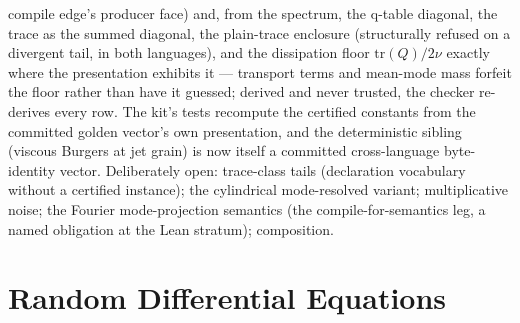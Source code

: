 compile edge's producer face) and, from the spectrum, the q-table
diagonal, the trace as the summed diagonal, the plain-trace
enclosure (structurally refused on a divergent tail, in both
languages), and the dissipation floor $\mathrm{tr}(Q)/2\nu$ exactly
where the presentation exhibits it --- transport terms and mean-mode
mass forfeit the floor rather than have it guessed; derived and
never trusted, the checker re-derives every row. The kit's tests
recompute the certified constants from the committed golden vector's
own presentation, and the deterministic sibling (viscous Burgers at
jet grain) is now itself a committed cross-language byte-identity
vector. Deliberately open: trace-class tails (declaration vocabulary
without a certified instance); the cylindrical mode-resolved
variant; multiplicative noise; the Fourier mode-projection semantics
(the compile-for-semantics leg, a named obligation at the Lean
stratum); composition.



\section{Random Differential Equations}
\label{sec:mt-rode}

